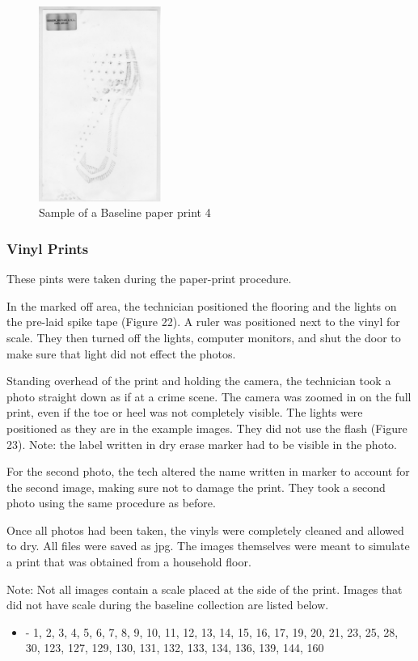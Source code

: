 \begin{figure}[!htp]
\centering
\includegraphics[width=4cm]{Baseline_Paper_4}
\caption{Sample of a Baseline paper print 4}
\label{Image 21}
\end{figure}

\newpage

\subsubsection{Vinyl Prints}

These pints were taken during the paper-print procedure.
   
   In the marked off area, the technician positioned the flooring and the lights on the pre-laid spike tape (Figure 22). A ruler was positioned next to the vinyl for scale. They then turned off the lights, computer monitors, and shut the door to make sure that light did not effect the photos.

   Standing overhead of the print and holding the camera, the technician took a photo straight down as if at a crime scene. The camera was zoomed in on the full print, even if the toe or heel was not completely visible. The lights were positioned as they are in the example images. They did not use the flash (Figure 23). Note: the label written in dry erase marker had to be visible in the photo.

   For the second photo, the tech altered the name written in marker to account for the second image, making sure not to damage the print. They took a second photo using the same procedure as before. 

   Once all photos had been taken, the vinyls were completely cleaned and allowed to dry. All files were saved as jpg. The images themselves were meant to simulate a print that was obtained from a household floor. 

Note: Not all images contain a scale placed at the side of the print. Images that did not have scale during the baseline collection are listed below.
\begin{itemize}

    \item - 1, 2, 3, 4, 5, 6, 7, 8, 9, 10, 11, 12, 13, 14, 15, 16, 17, 19, 20, 21, 23, 25, 28, 30, 123, 127, 129, 130, 131, 132, 133, 134, 136, 139, 144, 160
\end{itemize}

